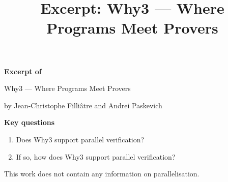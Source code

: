 \documentclass{scrartcl}
\title{Excerpt: Why3 — Where Programs Meet Provers}
\begin{document}
\begin{center}
\Large{\textbf{Excerpt of}}

\LARGE{Why3 — Where Programs Meet Provers}

\large{by Jean-Christophe Filliâtre and Andrei Paskevich}
\end{center}

\vspace{1cm}

\begin{addmargin}[0.2\linewidth]{0.2\linewidth}
\begin{center}
\textbf{Key questions}
\end{center}
\begin{enumerate}[i]
  \item Does Why3 support parallel verification?
  \item If so, how does Why3 support parallel verification?
\end{enumerate}
\end{addmargin}

\vspace{1cm}

This work does not contain any information on parallelisation.
\end{document}
